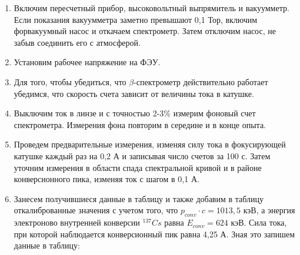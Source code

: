 \documentclass[a4paper, 12pt]{article}%
\newcommand{\be}{\ensuremath{\beta}}
\begin{document}
\begin{enumerate}
\item Включим пересчетный прибор, высоковольтный выпрямитель и вакуумметр. Если показания вакуумметра заметно превышают 0,1 Тор, включим форвакуумный насос и откачаем спектрометр. Затем отключим насос, не забыв соединить его с атмосферой.

\item Установим рабочее напряжение на ФЭУ.

\item Для того, чтобы убедиться, что \be-спектрометр действительно работает убедимся, что скорость счета зависит от величины тока в катушке.

\item Выключим ток в линзе и с точностью 2-3$\%$ измерим фоновый счет спектрометра. Измерения фона повторим в середине и в конце опыта.

\item Проведем предварительные измерения, изменяя силу тока в фокусирующей катушке каждый раз на 0,2 А и записывая число счетов за 100 с. Затем уточним измерения в области спада спектральной кривой и в районе конверсионного пика, изменяя ток с шагом в 0,1 А.

\item Занесем получившиеся данные в таблицу и также добавим в таблицу откалиброванные значения с учетом того, что $p_{conv}\cdot c = 1013,5$ кэВ, а энергия электроново внутренней конверсии $^{137}Cs$ равна $E_{conv} = 624$ кэВ. Сила тока, при которой наблюдается конверсионный пик равна 4,25 А. Зная это запишем данные в таблицу:


\end{enumerate}
\end{document}

